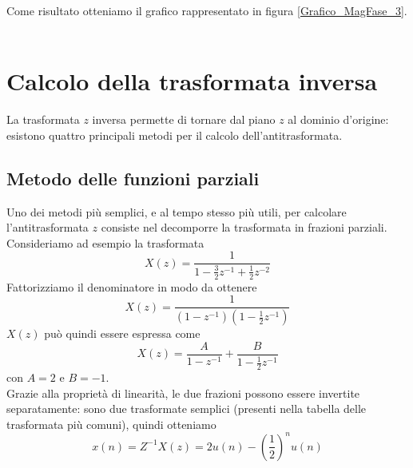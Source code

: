 Come risultato otteniamo il grafico rappresentato in figura \ref{Grafico_MagFase_3}.\\\\



\section{Calcolo della trasformata inversa}
La trasformata $z$ inversa permette di tornare dal piano $z$ al dominio d'origine: esistono quattro principali metodi per il calcolo dell'antitrasformata.
\subsection{Metodo delle funzioni parziali}
Uno dei metodi pi\`u semplici, e al tempo stesso pi\`u utili, per calcolare l'antitrasformata $z$ consiste nel decomporre la trasformata in frazioni parziali.
Consideriamo ad esempio la trasformata
\begin{displaymath}
X(z)=\frac{1}{1-\frac{3}{2}z^{-1}+\frac{1}{2}z^{-2}}
\end{displaymath}
Fattorizziamo il denominatore in modo da ottenere
\begin{displaymath}
X(z)=\frac{1}{(1-z^{-1})(1-\frac{1}{2}z^{-1})}
\end{displaymath}
$X(z)$ pu\`o quindi essere espressa come 
\begin{displaymath}
X(z)=\frac{A}{1-z^{-1}}+\frac{B}{1-\frac{1}{2}z^{-1}}
\end{displaymath}
con $A=2$ e $B=-1$.\\
Grazie alla propriet\`a di linearit\`a, le due frazioni possono essere invertite separatamente: sono due trasformate semplici (presenti nella tabella delle trasformata pi\`u comuni), quindi otteniamo
\begin{displaymath}
x(n)=Z^{-1}{X(z)}=2u(n)-\left ({\frac{1}{2}}\right )^n u(n)
\end{displaymath}
